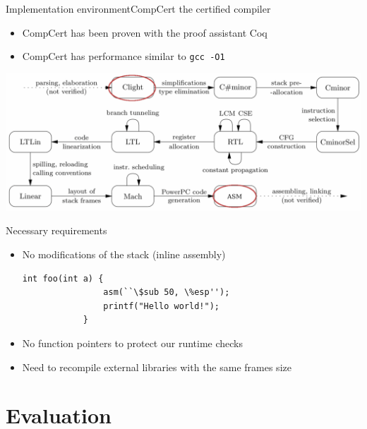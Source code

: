 \documentclass{beamer}
\begin{document}
\begin{frame}[c]{Implementation environment}{CompCert the certified compiler}
	\begin{itemize}
		\item CompCert has been proven with the proof assistant Coq
		\item CompCert has performance similar to \texttt{gcc -O1}
	\end{itemize}
	\hfill \break
	\includegraphics[width=\textwidth]{images/compcert_pass.pdf}
\end{frame}

\begin{frame}[fragile]{Necessary requirements}
	\begin{itemize}
		\item No modifications of the stack (inline assembly)
			\begin{lstlisting}[tabsize=2,frame=single,linewidth=7cm]
			int foo(int a) {
				asm(``\$sub 50, \%esp'');
				printf("Hello world!");
			}
			\end{lstlisting}
		\item No function pointers to protect our runtime checks
		\item Need to recompile external libraries with the same frames size
	\end{itemize}
\end{frame}

\section{Evaluation}
\label{sec:Implementation}
\end{document}
